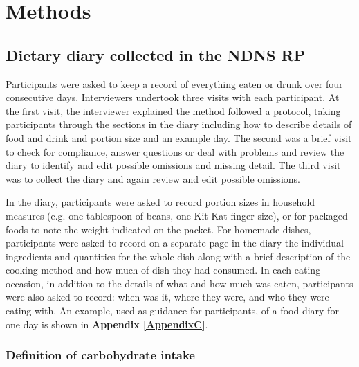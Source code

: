
\chapter{Methods} %

\label{Chapter 2} %


\section{Dietary diary collected in the NDNS RP}\vspace{-0.3cm}

Participants were asked to keep a record of everything eaten or drunk over four consecutive days. Interviewers undertook three visits with each participant. At the first visit, the interviewer explained the method followed a protocol, taking participants through the sections in the diary including how to describe details of food and drink and portion size and an example day. The second was a brief visit to check for compliance, answer questions or deal with problems and review the diary to identify and edit possible omissions and missing detail. The third visit was to collect the diary and again review and edit possible omissions. 

In the diary, participants were asked to record portion sizes in household measures (e.g. one tablespoon of beans, one Kit Kat finger-size), or for packaged foods to note the weight indicated on the packet. For homemade dishes, participants were asked to record on a separate page in the diary the individual ingredients and quantities for the whole dish along with a brief description of the cooking method and how much of dish they had consumed. In each eating occasion, in addition to the details of what and how much was eaten, participants were also asked to record: when was it, where they were, and who they were eating with. An example, used as guidance for participants, of a food diary for one day is shown in \textbf{Appendix \ref{AppendixC}}.\vspace{-0.3cm}

\subsection{Definition of carbohydrate intake}\vspace{-0.3cm}

